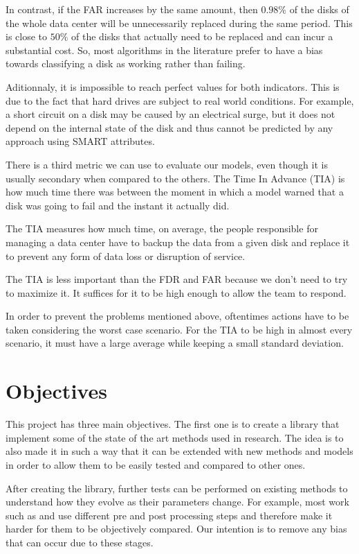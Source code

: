 In contrast, if the FAR increases by the same amount, then $0.98\%$ of the disks of the whole data center will be unnecessarily replaced during the same period.
This is close to $50\%$ of the disks that actually need to be replaced and can incur a substantial cost.
So, most algorithms in the literature prefer to have a bias towards classifying a disk as working rather than failing.

Aditionnaly, it is impossible to reach perfect values for both indicators.
This is due to the fact that hard drives are subject to real world conditions.
For example, a short circuit on a disk may be caused by an electrical surge, but it does not depend on the internal state of the disk and thus cannot be predicted by any approach using SMART attributes.

There is a third metric we can use to evaluate our models, even though it is usually secondary when compared to the others.
The Time In Advance (TIA) is how much time there was between the moment in which a model warned that a disk was going to fail and the instant it actually did.

The TIA measures how much time, on average, the people responsible for managing a data center have to backup the data from a given disk and replace it to prevent any form of data loss or disruption of service.

The TIA is less important than the FDR and FAR because we don't need to try to maximize it.
It suffices for it to be high enough to allow the team to respond.

In order to prevent the problems mentioned above, oftentimes actions have to be taken considering the worst case scenario.
For the TIA to be high in almost every scenario, it must have a large average while keeping a small standard deviation.

\section{Objectives}

This project has three main objectives.
The first one is to create a library that implement some of the state of the art methods used in research.
The idea is to also made it in such a way that it can be extended with new methods and models in order to allow them to be easily tested and compared to other ones. 

After creating the library, further tests can be performed on existing methods to understand how they evolve as their parameters change.
For example, most work such as \cite{Zhu13} and \cite{Xu16} use different pre and post processing steps and therefore make it harder for them to be objectively compared.
Our intention is to remove any bias that can occur due to these stages.

